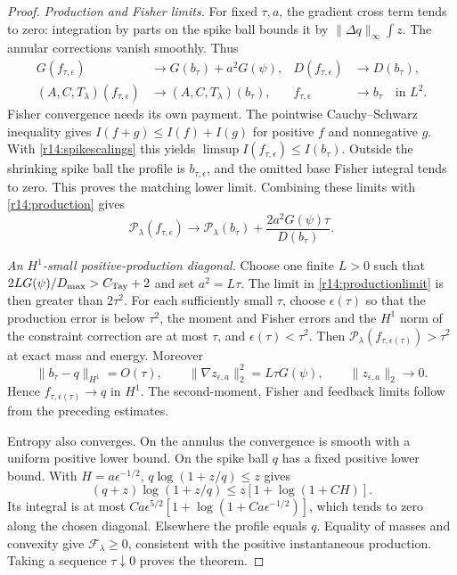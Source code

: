 \documentclass[11pt]{article}
\numberwithin{equation}{section}
\begin{document}
\begin{proof}
\emph{Production and Fisher limits.}
For fixed $\tau,a$, the gradient cross term tends to zero: integration
by parts on the spike ball bounds it by
$\|\Delta q\|_\infty\int z$. The annular corrections vanish smoothly.
Thus
\begin{align}
 G(f_{\tau,\epsilon})&\longrightarrow G(b_\tau)+a^2G(\psi),&
 D(f_{\tau,\epsilon})&\longrightarrow D(b_\tau),\nonumber\\
 (A,C,T_\lambda)(f_{\tau,\epsilon})
 &\longrightarrow(A,C,T_\lambda)(b_\tau),&
 f_{\tau,\epsilon}&\longrightarrow b_\tau\quad\text{in }L^2.
 \label{r14:spikelimits}
\end{align}
Fisher convergence needs its own payment. The pointwise
Cauchy--Schwarz inequality gives $I(f+g)\le I(f)+I(g)$ for positive
$f$ and nonnegative $g$. With \eqref{r14:spikescalings} this yields
$\limsup I(f_{\tau,\epsilon})\le I(b_\tau)$. Outside the shrinking
spike ball the profile is $b_{\tau,\epsilon}$, and the omitted base
Fisher integral tends to zero. This proves the matching lower limit.
Combining these limits with \eqref{r14:production} gives
\begin{equation}\label{r14:productionlimit}
 \mathcal P_\lambda(f_{\tau,\epsilon})\longrightarrow
 \mathcal P_\lambda(b_\tau)
       +\frac{2a^2G(\psi)\tau}{D(b_\tau)}.
\end{equation}

\emph{An $H^1$-small positive-production diagonal.}
Choose one finite $L>0$ such that
$2LG(\psi)/D_{\max}>C_{\rm Tay}+2$ and set $a^2=L\tau$.
The limit in \eqref{r14:productionlimit} is then greater than
$2\tau^2$. For each sufficiently small $\tau$, choose $\epsilon(\tau)$
so that the production error is below $\tau^2$, the moment and Fisher
errors and the $H^1$ norm of the constraint correction are at most
$\tau$, and $\epsilon(\tau)<\tau^2$. Then
$\mathcal P_\lambda(f_{\tau,\epsilon(\tau)})>\tau^2$ at exact mass
and energy. Moreover
\[
 \|b_\tau-q\|_{H^1}=O(\tau),\qquad
 \|\nabla z_{\epsilon,a}\|_2^2=L\tau G(\psi),
 \qquad\|z_{\epsilon,a}\|_2\longrightarrow0.
\]
Hence $f_{\tau,\epsilon(\tau)}\to q$ in $H^1$. The second-moment,
Fisher and feedback limits follow from the preceding estimates.

Entropy also converges. On the annulus the convergence is smooth with
a uniform positive lower bound. On the spike ball $q$ has a fixed
positive lower bound. With $H=a\epsilon^{-1/2}$,
$q\log(1+z/q)\le z$ gives
\[
 (q+z)\log(1+z/q)\le z[1+\log(1+C H)].
\]
Its integral is at most
$C a\epsilon^{5/2}[1+\log(1+C a\epsilon^{-1/2})]$, which tends to
zero along the chosen diagonal. Elsewhere the profile equals $q$.
Equality of masses and convexity give $\mathcal F_\lambda\ge0$,
consistent with the positive instantaneous production. Taking a sequence
$\tau\downarrow0$ proves the theorem.
\end{proof}
\end{document}
